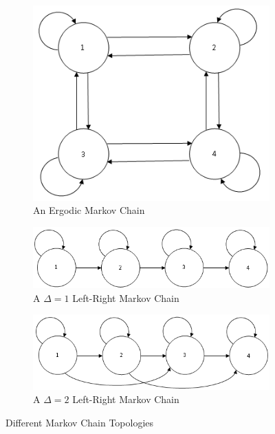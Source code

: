 \begin{figure}
        \centering
        \begin{subfigure}[b]{0.5\textwidth}
                \centering
                \includegraphics[width=1.0\textwidth]{ThesisFigs/erdogicMC}
                \caption{An Ergodic Markov Chain}
                \label{fig:unclust}
        \end{subfigure} 
        \begin{subfigure}[b]{0.5\textwidth}
                \centering
                \includegraphics[width=1.0\textwidth]{ThesisFigs/del1LRMC}
                \caption{A $\Delta = 1$ Left-Right Markov Chain}
                \label{fig:clust}
        \end{subfigure}
	   \begin{subfigure}[b]{0.5\textwidth}
                \centering
                \includegraphics[width=1.0\textwidth]{ThesisFigs/del2LRMC}
                \caption{A $\Delta = 2$ Left-Right Markov Chain}
                \label{fig:clust}
        \end{subfigure}
        \caption{Different Markov Chain Topologies}\label{fig:mctop}
\end{figure}

